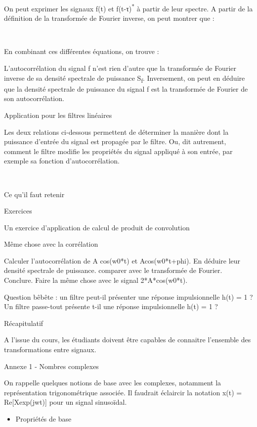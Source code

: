 \documentclass[]{article}
\begin{document}
On peut exprimer les signaux f(t) et f(t-τ)\textsuperscript{*} à partir
de leur spectre. A partir de la définition de la transformée de Fourier
inverse, on peut montrer que :~

~~

En combinant ces différentes équations, on trouve :~

L'autocorrélation du signal f n'est rien d'autre que la transformée de
Fourier inverse de sa densité spectrale de puissance S\textsubscript{f}.
Inversement, on peut en déduire que la densité spectrale de puissance du
signal f est la transformée de Fourier de son autocorrélation.

Application pour les filtres linéaires

Les deux relations ci-dessous permettent de déterminer la manière dont
la puissance d'entrée du signal est propagée par le filtre. Ou, dit
autrement, comment le filtre modifie les propriétés du signal appliqué à
son entrée, par exemple sa fonction d'autocorrélation.

~~ ~

Ce qu'il faut retenir

Exercices

Un exercice d'application de calcul de produit de convolution

Même chose avec la corrélation

Calculer l'autocorrélation de A cos(w0*t) et Acos(w0*t+phi). En déduire
leur densité spectrale de puissance. comparer avec le transformée de
Fourier. Conclure. Faire la même chose avec le signal 2*A*cos(w0*t).

Question bêbête : un filtre peut-il présenter une réponse impulsionnelle
h(t) = 1 ? Un filtre passe-tout présente t-il une réponse impulsionnelle
h(t) = 1 ?

Récapitulatif

A l'issue du cours, les étudiants doivent être capables de connaitre
l'ensemble des transformations entre signaux.

Annexe 1 - Nombres complexes

On rappelle quelques notions de base avec les complexes, notamment la
représentation trigonométrique associée. Il faudrait éclaircir la
notation x(t) = Re{[}Xexp(jwt){]} pour un signal sinusoïdal.

\begin{itemize}
\itemsep1pt\parskip0pt
\item
  Propriétés de base
\end{itemize}
\end{document}
